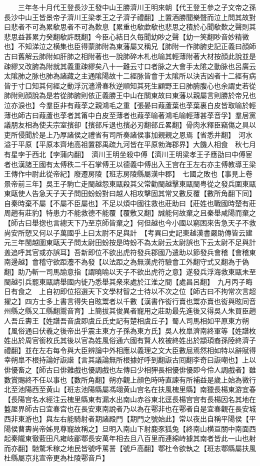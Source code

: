 　　三年冬十月代王登長沙王發中山王勝濟川王明來朝【代王登王參之子文帝之孫長沙中山王皆景帝子濟川王梁孝王之子濟子禮翻】上置酒勝聞樂聲而泣上問其故對曰悲者不可為累欷思者不可為歎息【累重也欷歔欷也悲思之積於心聞欷歎之聲則其悲思益甚累力癸翻欷許既翻】今臣心結日久每聞幼眇之聲【幼一笑翻眇音妙精微也】不知涕泣之横集也臣得蒙肺附為東藩屬又稱兄【肺附一作肺腑史記正義曰顔師古曰舊解云肺附如肝肺之相附著也一說肺碎木札也喻其輕薄附著大材按顔此說並是疎繆又改腑為附就其義重疎繆矣八十一難云寸口者脉之大會手太隂之動脉也呂廣云太隂肺之脉也肺為諸藏之主通隂陽故十二經脉皆會于太隂所以決吉凶者十二經有病皆于寸口知其何經之動浮沉濇滑春秋逆順知其死生顧野王曰肺腑腹心也余謂史若從肺附則顔說為是若從肺腑則依正義勝王中山在關東故曰東藩以親屬言則勝於帝兄也泣亦淚也】今羣臣非有葭莩之親鴻毛之重【張晏曰葭蘆葉也莩葉裏白皮皆取喻於輕薄也師古曰葭蘆也莩者其筩中白皮至薄者也葭莩喻著鴻毛喻輕薄甚莩音孚】羣居黨議朋友相為使夫宗室擯卻【擯郤斥退也擯必刃翻郤丘畧翻】骨肉氷釋臣竊傷之具以吏所侵聞於是上乃厚諸侯之禮省有司所奏諸侯事加親親之恩焉【省悉井翻】　河水溢于平原【平原本齊地高祖置郡禹疏九河皆在平原勃海郡界】大饑人相食　秋七月有星孛于西北【孛蒲内翻】　濟川王明坐殺中傅【濟川王明梁孝王子應劭曰中傅宦者也漢諸王國有太傅秩二千石掌傅王以德義中傅出入王宫在王左右亦主傅教導王梁王傳作中尉此從帝紀】廢遷房陵【班志房陵縣屬漢中郡】　七國之敗也【事見上卷景帝前三年】吳王子駒亡走閩越怨東甌殺其父常勸閩越擊東甌閩粤從之發兵圍東甌東甌使人告急天子天子問田蚡蚡對曰越人相攻擊固其常又數反覆【數所角翻下同】自秦時棄不屬【不屬不臣屬也】不足以煩中國往救也莊助曰【莊姓也戰國時楚有莊周趙有莊豹】特患力不能救德不能覆【覆敷又翻】誠能何故棄之且秦舉咸陽而棄之【師古曰舉揔也言總天下乃至京師皆棄之】何但越也今小國以窮困來吿急天子不救尚安所愬又何以子萬國乎上曰太尉不足與計　【考異曰史記東越漢書嚴助傳皆云建元三年閩越圍東甌天子問太尉田蚡按是時蚡不為太尉云太尉誤也下云太尉不足與計盖追呼其官或亦誤耳】吾新即位不欲出虎符發兵郡國乃遣助以節發兵會稽【會稽東南邊越】會稽守欲距灋不為發【以法距之為無漢虎符驗會工外翻守式又翻為于偽翻】助乃斬一司馬諭意指【謂曉喻以天子不欲出虎符之意】遂發兵浮海救東甌未至閩越引兵罷東甌請舉國内徙乃悉舉其衆來處於江淮之間【處昌呂翻】　九月丙子晦日有食之　上自初即位招選天下文學材智之士待以不次之位【師古曰不拘常次言超擢之】四方士多上書言得失自眩鬻者以千數【漢書作衒行賣也鬻亦賣也衒與眩同音州縣之縣又工縣翻鬻音育】上簡拔其俊異者寵用之莊助最先進後又得吳人朱買臣趙人吾丘夀王【姓譜吾音虞即虞丘氏史記有楚相虞丘子】蜀人司馬相如平原東方朔【風俗通曰伏羲之後帝出乎震主東方子孫為東方氏】吳人枚臯濟南終軍等【姓譜枚姓出於周官銜枚氏其後以官為姓風俗通六國有賢人枚被終姓出於顓頊裔孫陸終濟子禮翻】並在左右每令與大臣辨論中外相應以義理之文大臣數屈焉然相如特以辭賦得幸朔臯不根持論好詼諧【言其議論無所根據好呼到翻詼古囘翻李奇曰詼嘲也】上以俳優畜之【師古曰俳雜戲也優調戲也左傳曰少相狎長相優俳優即今伶人調戲者】雖數賞賜終不任以事也【數所角翻】朔亦觀上顔色時時直諫有所補益是歲上始為微行北至池陽西至黄山【班志池陽縣屬馮翊黄山宫名在扶風槐里縣】南獵長楊東游宜春【長陽宫名水經注云槐里縣東有漏水出南山赤谷東北逕長楊宫宫有長楊因名其地在盭厔界師古曰宜春宫也在長安東南說者乃以為在鄠非也在鄠者自是宜春觀在長安城西非東游也】與左右能騎射者期諸殿門【期門之號始此】常以夜出自稱平陽侯【平陽侯曹夀尚帝姊見尊寵故稱之】旦明入南山下射鹿豕狐兔【終南山横亘關中南面西起秦隴東徹藍田凡雍岐郿鄠長安萬年相去且八百里而連綿峙據其南者皆此一山也射而亦翻】馳騖禾稼之地民皆號呼罵詈【號戶高翻】鄠杜令欲執之【班志鄠縣屬扶風杜縣屬京兆宣帝更為杜陵鄠音戶】